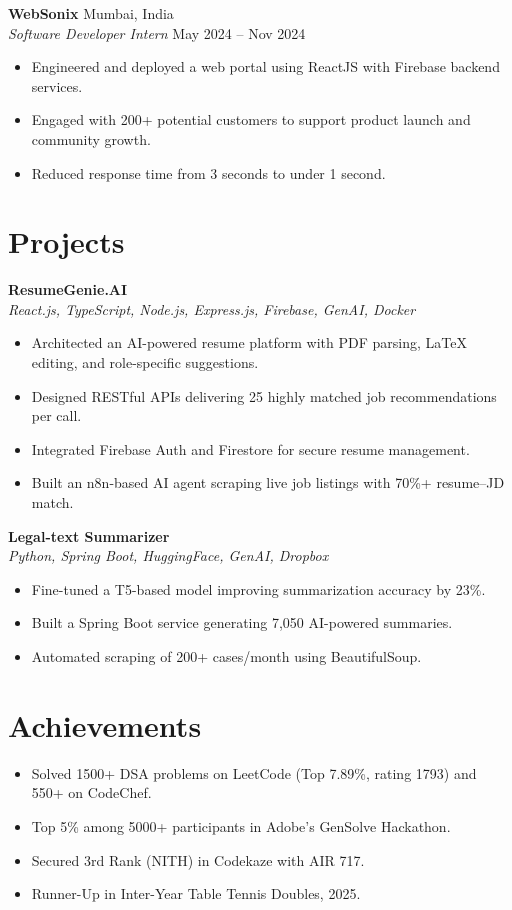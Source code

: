 \documentclass[a4paper,11pt]{article}
\newcommand{\resumeItem}[1]{
  \item \small{#1}
}
\newcommand{\projectHeading}[2]{
  \vspace{4pt}
  \textbf{#1} \\
  \textit{#2}
  \vspace{2pt}
}
\begin{document}
\vspace{4pt}

\textbf{WebSonix} \hfill Mumbai, India \\
\textit{Software Developer Intern} \hfill May 2024 -- Nov 2024

\begin{itemize}
\resumeItem{Engineered and deployed a web portal using ReactJS with Firebase backend services.}
\resumeItem{Engaged with 200+ potential customers to support product launch and community growth.}
\resumeItem{Reduced response time from 3 seconds to under 1 second.}
\end{itemize}

\section{Projects}

\projectHeading
{ResumeGenie.AI}
{React.js, TypeScript, Node.js, Express.js, Firebase, GenAI, Docker}

\begin{itemize}
\resumeItem{Architected an AI-powered resume platform with PDF parsing, LaTeX editing, and role-specific suggestions.}
\resumeItem{Designed RESTful APIs delivering 25 highly matched job recommendations per call.}
\resumeItem{Integrated Firebase Auth and Firestore for secure resume management.}
\resumeItem{Built an n8n-based AI agent scraping live job listings with 70\%+ resume–JD match.}
\end{itemize}

\vspace{4pt}

\projectHeading
{Legal-text Summarizer}
{Python, Spring Boot, HuggingFace, GenAI, Dropbox}

\begin{itemize}
\resumeItem{Fine-tuned a T5-based model improving summarization accuracy by 23\%.}
\resumeItem{Built a Spring Boot service generating 7,050 AI-powered summaries.}
\resumeItem{Automated scraping of 200+ cases/month using BeautifulSoup.}
\end{itemize}

\section{Achievements}

\begin{itemize}
\item \small{Solved 1500+ DSA problems on LeetCode (Top 7.89\%, rating 1793) and 550+ on CodeChef.}
\item \small{Top 5\% among 5000+ participants in Adobe’s GenSolve Hackathon.}
\item \small{Secured 3rd Rank (NITH) in Codekaze with AIR 717.}
\item \small{Runner-Up in Inter-Year Table Tennis Doubles, 2025.}
\end{itemize}
\end{document}
